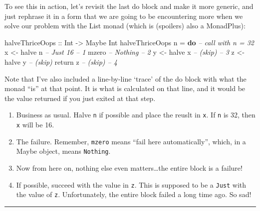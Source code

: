 \documentclass[]{article}
\newenvironment{Shaded}{}{}
\newcommand{\KeywordTok}[1]{\textcolor[rgb]{0.00,0.44,0.13}{\textbf{#1}}}
\newcommand{\DataTypeTok}[1]{\textcolor[rgb]{0.56,0.13,0.00}{#1}}
\newcommand{\CommentTok}[1]{\textcolor[rgb]{0.38,0.63,0.69}{\textit{#1}}}
\newcommand{\OtherTok}[1]{\textcolor[rgb]{0.00,0.44,0.13}{#1}}
\newcommand{\FunctionTok}[1]{\textcolor[rgb]{0.02,0.16,0.49}{#1}}
\newcommand{\NormalTok}[1]{#1}
\begin{document}
To see this in action, let's revisit the last do block and make it more generic,
and just rephrase it in a form that we are going to be encountering more when we
solve our problem with the List monad (which is (spoilers) also a MonadPlus):

\begin{Shaded}
\begin{Highlighting}[]
\OtherTok{halveThriceOops ::} \DataTypeTok{Int} \OtherTok{->} \DataTypeTok{Maybe} \DataTypeTok{Int}
\NormalTok{halveThriceOops n }\FunctionTok{=} \KeywordTok{do}          \CommentTok{-- call with n = 32}
\NormalTok{    x }\OtherTok{<-}\NormalTok{ halve n                }\CommentTok{-- Just 16              -- 1}
\NormalTok{    mzero                       }\CommentTok{-- Nothing              -- 2}
\NormalTok{    y }\OtherTok{<-}\NormalTok{ halve x                }\CommentTok{-- (skip)               -- 3}
\NormalTok{    z }\OtherTok{<-}\NormalTok{ halve y                }\CommentTok{-- (skip)}
\NormalTok{    return z                    }\CommentTok{-- (skip)               -- 4}
\end{Highlighting}
\end{Shaded}

Note that I've also included a line-by-line `trace' of the do block with what
the monad ``is'' at that point. It is what is calculated on that line, and it
would be the value returned if you just exited at that step.

\begin{enumerate}
\def\labelenumi{\arabic{enumi}.}
\tightlist
\item
  Business as usual. Halve \texttt{n} if possible and place the reuslt in
  \texttt{x}. If \texttt{n} is 32, then \texttt{x} will be 16.
\item
  The failure. Remember, \texttt{mzero} means ``fail here automatically'',
  which, in a Maybe object, means \texttt{Nothing}.
\item
  Now from here on, nothing else even matters\ldots{}the entire block is a
  failure!
\item
  If possible, succeed with the value in \texttt{z}. This is supposed to be a
  \texttt{Just} with the value of \texttt{z}. Unfortunately, the entire block
  failed a long time ago. So sad!
\end{enumerate}

\begin{center}\rule{0.5\linewidth}{\linethickness}\end{center}
\end{document}
